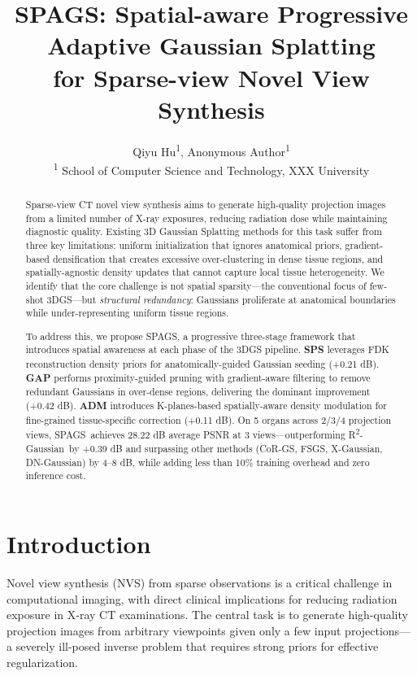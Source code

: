 \documentclass{egPublStyle}
\title{SPAGS: Spatial-aware Progressive Adaptive Gaussian Splatting\\
       for Sparse-view Novel View Synthesis}
\author{
  Qiyu Hu\textsuperscript{1},
  Anonymous Author\textsuperscript{1}
  \vspace{4pt}\\
  \textsuperscript{1} School of Computer Science and Technology, XXX University
}
\newcommand{\spags}{SPAGS}
\newcommand{\sps}{SPS}
\newcommand{\gap}{GAP}
\newcommand{\adm}{ADM}
\newcommand{\rtwo}{R\textsuperscript{2}-Gaussian}
\begin{document}
\maketitle

\begin{abstract}
Sparse-view CT novel view synthesis aims to generate high-quality projection images from a limited number of X-ray exposures, reducing radiation dose while maintaining diagnostic quality. Existing 3D Gaussian Splatting methods for this task suffer from three key limitations: uniform initialization that ignores anatomical priors, gradient-based densification that creates excessive over-clustering in dense tissue regions, and spatially-agnostic density updates that cannot capture local tissue heterogeneity. We identify that the core challenge is not spatial sparsity---the conventional focus of few-shot 3DGS---but \textit{structural redundancy}: Gaussians proliferate at anatomical boundaries while under-representing uniform tissue regions.

To address this, we propose \spags, a progressive three-stage framework that introduces spatial awareness at each phase of the 3DGS pipeline. \textbf{\sps} leverages FDK reconstruction density priors for anatomically-guided Gaussian seeding (+0.21 dB). \textbf{\gap} performs proximity-guided pruning with gradient-aware filtering to remove redundant Gaussians in over-dense regions, delivering the dominant improvement (+0.42 dB). \textbf{\adm} introduces K-planes-based spatially-aware density modulation for fine-grained tissue-specific correction (+0.11 dB). On 5 organs across 2/3/4 projection views, \spags\ achieves 28.22 dB average PSNR at 3 views---outperforming \rtwo\ by +0.39 dB and surpassing other methods (CoR-GS, FSGS, X-Gaussian, DN-Gaussian) by 4--8 dB, while adding less than 10\% training overhead and zero inference cost.
\end{abstract}

\section{Introduction}
\label{sec:intro}

Novel view synthesis (NVS) from sparse observations is a critical challenge in computational imaging, with direct clinical implications for reducing radiation exposure in X-ray CT examinations. The central task is to generate high-quality projection images from arbitrary viewpoints given only a few input projections---a severely ill-posed inverse problem that requires strong priors for effective regularization.
\end{document}

